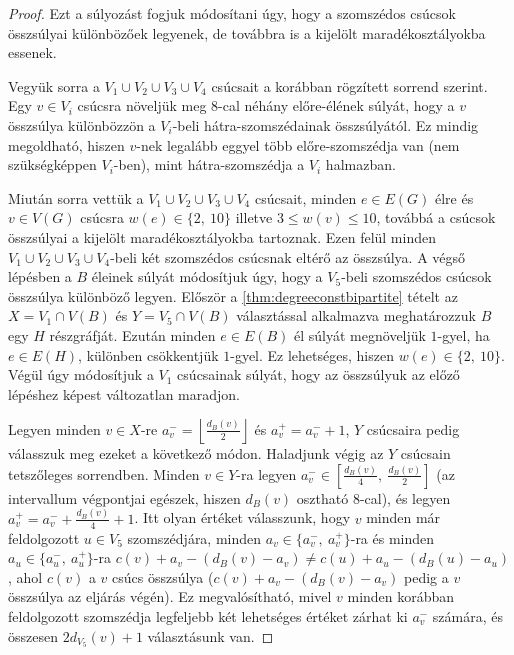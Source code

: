 \documentclass[12pt, a4paper]{report}
\theoremstyle{remark}
\theoremstyle{definition}
\begin{document}
\begin{proof}
Ezt a súlyozást fogjuk módosítani úgy, hogy a szomszédos csúcsok összsúlyai különbözőek legyenek, de továbbra is a kijelölt maradékosztályokba essenek.

Vegyük sorra a $V_1 \cup V_2 \cup V_3 \cup V_4$ csúcsait a korábban rögzített sorrend szerint. Egy $v \in V_i$ csúcsra növeljük meg $8$-cal néhány előre-élének súlyát, hogy a $v$ összsúlya különbözzön a $V_i$-beli hátra-szomszédainak összsúlyától. Ez mindig megoldható, hiszen $v$-nek legalább eggyel több előre-szomszédja van (nem szükségképpen $V_i$-ben), mint hátra-szomszédja a $V_i$ halmazban.

Miután sorra vettük a $V_1 \cup V_2 \cup V_3 \cup V_4$ csúcsait, minden $e \in E(G)$ élre és $v \in V(G)$ csúcsra $w(e) \in \lbrace 2,\ 10 \rbrace$ illetve $3 \leq w(v) \leq 10$, továbbá a csúcsok összsúlyai a kijelölt maradékosztályokba tartoznak. Ezen felül minden $V_1 \cup V_2 \cup V_3 \cup V_4$-beli két szomszédos csúcsnak eltérő az összsúlya. A végső lépésben a $B$ éleinek súlyát módosítjuk úgy, hogy a $V_5$-beli szomszédos csúcsok összsúlya különböző legyen. Először a \ref{thm:degreeconstbipartite} tételt az $X = V_1 \cap V(B)$ és $Y = V_5 \cap V(B)$ választással alkalmazva meghatározzuk $B$ egy $H$ részgráfját. Ezután minden $e \in E(B)$ él súlyát megnöveljük $1$-gyel, ha $e \in E(H)$, különben csökkentjük $1$-gyel. Ez lehetséges, hiszen $w(e) \in \lbrace 2,\ 10 \rbrace$. Végül úgy módosítjuk a $V_1$ csúcsainak súlyát, hogy az összsúlyuk az előző lépéshez képest változatlan maradjon.

Legyen minden $v \in X$-re $a_v^- = \left\lfloor \frac{d_B(v)}{2} \right\rfloor$ és $a_v^+ = a_v^- + 1$, $Y$ csúcsaira pedig válasszuk meg ezeket a következő módon. Haladjunk végig az $Y$ csúcsain tetszőleges sorrendben. Minden $v \in Y$-ra legyen $a_v^- \in \left\lbrack \frac{d_B(v)}{4},\ \frac{d_B(v)}{2} \right\rbrack$ (az intervallum végpontjai egészek, hiszen $d_B(v)$ osztható $8$-cal), és legyen $a_v^+ = a_v^- + \frac{d_B(v)}{4} + 1$. Itt olyan értéket válasszunk, hogy $v$ minden már feldolgozott $u \in V_5$ szomszédjára, minden $a_v \in \lbrace a_v^-,\ a_v^+ \rbrace$-ra és minden $a_u \in \lbrace a_u^-,\ a_u^+ \rbrace$-ra $c(v) + a_v - (d_B(v) - a_v) \neq c(u) + a_u - (d_B(u) - a_u)$, ahol $c(v)$ a $v$ csúcs összsúlya ($c(v) + a_v - (d_B(v) - a_v)$ pedig a $v$ összsúlya az eljárás végén). Ez megvalósítható, mivel $v$ minden korábban feldolgozott szomszédja legfeljebb két lehetséges értéket zárhat ki $a_v^-$ számára, és összesen $2d_{V_5}(v) + 1$ választásunk van.


\end{proof}
\end{document}
